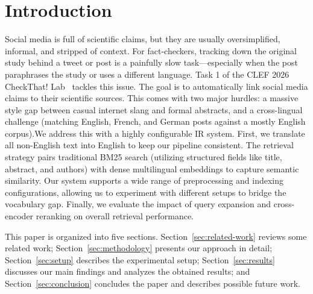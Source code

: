 \section{Introduction}
\label{sec:introduction}
Social media is full of scientific claims, but they are usually oversimplified, informal, and stripped of context. For fact-checkers, tracking down the original study behind a tweet or post is a painfully slow task—especially when the post paraphrases the study or uses a different language. Task 1 of the CLEF 2026 CheckThat! Lab~\cite{clef-checkthat:2026:task1} tackles this issue. The goal is to automatically link social media claims to their scientific sources. This comes with two major hurdles: a massive style gap between casual internet slang and formal abstracts, and a cross-lingual challenge (matching English, French, and German posts against a mostly English corpus).We address this with a highly configurable IR system. First, we translate all non-English text into English to keep our pipeline consistent. The retrieval strategy pairs traditional BM25 search (utilizing structured fields like title, abstract, and authors) with dense multilingual embeddings to capture semantic similarity. Our system supports a wide range of preprocessing and indexing configurations, allowing us to experiment with different setups to bridge the vocabulary gap. Finally, we evaluate the impact of query expansion and cross-encoder reranking on overall retrieval performance.

This paper is organized into five sections. Section~\ref{sec:related-work} reviews some related work; Section~\ref{sec:methodology} presents our approach in detail; Section~\ref{sec:setup} describes the experimental setup; Section~\ref{sec:results} discusses our main findings and analyzes the obtained results; and Section~\ref{sec:conclusion} concludes the paper and describes possible future work.